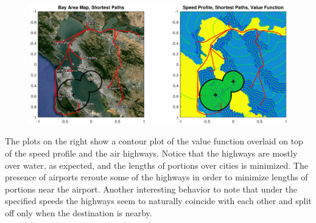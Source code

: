 \documentclass[12pt,draftcls,onecolumn]{IEEEtran}
\numberwithin{algorithm}{section}
\begin{document}
\begin{figure}
	\centering
	\includegraphics[width=\textwidth]{"fig/pathsValueAirport"}
	\caption{}
	\label{fig:pathsValueAirport}
\end{figure}

The plots on the right show a contour plot of the value function overlaid on top of the speed profile and the air highways. Notice that the highways are mostly over water, as expected, and the lengths of portions over cities is minimized. The presence of airports reroute some of the highways in order to minimize lengths of portions near the airport. Another interesting behavior to note that under the specified speeds the highways seem to naturally coincide with each other and split off only when the destination is nearby.
\end{document}
